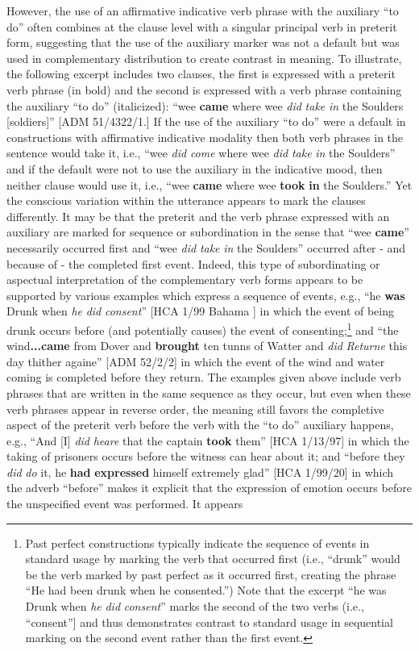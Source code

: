 However, the use of an affirmative indicative verb phrase with the auxiliary “to do” often combines at the clause level with a singular principal verb in preterit form, suggesting that the use of the auxiliary marker was not a default but was used in complementary distribution to create contrast in meaning. To illustrate, the following excerpt includes two clauses, the first is expressed with a preterit verb phrase (in bold) and the second is expressed with a verb phrase containing the auxiliary “to do” (italicized): “wee \textbf{came} where wee \textit{did} \textit{take} \textit{in} the Soulders [soldiers]” [ADM 51/4322/1.] If the use of the auxiliary “to do” were a default in constructions with affirmative indicative modality then both verb phrases in the sentence would take it, i.e., “wee \textit{did} \textit{come} where wee \textit{did} \textit{take} \textit{in} the Soulders” and if the default were not to use the auxiliary in the indicative mood, then neither clause would use it, i.e., “wee \textbf{came} where wee \textbf{took} \textbf{in} the Soulders.” Yet the conscious variation within the utterance appears to mark the clauses differently. It may be that the preterit and the verb phrase expressed with an auxiliary are marked for sequence or subordination in the sense that “wee \textbf{came}” necessarily occurred first and “wee \textit{did} \textit{take} \textit{in} the Soulders” occurred after - and because of - the completed first event. Indeed, this type of subordinating or aspectual interpretation of the complementary verb forms appears to be supported by various examples which express a sequence of events, e.g., “he \textbf{was} Drunk when \textit{he} \textit{did} \textit{consent}” [HCA 1/99 Bahama \citealt{Islands1722}] in which the event of being drunk occurs before (and potentially causes) the event of consenting;\footnote{Past perfect constructions typically indicate the sequence of events in standard usage by marking the verb that occurred first (i.e., “drunk” would be the verb marked by past perfect as it occurred first, creating the phrase “He had been drunk when he consented.”) Note that the excerpt “he was Drunk when \textit{he} \textit{did} \textit{consent}” marks the second of the two verbs (i.e., “consent”] and thus demonstrates contrast to standard usage in sequential marking on the second event rather than the first event.}  and “the wind\textbf{...came} from Dover and \textbf{brought} ten tunns of Watter and \textit{did} \textit{Returne} this day thither againe” [ADM 52/2/2] in which the event of the wind and water coming is completed before they return. The examples given above include verb phrases that are written in the same sequence as they occur, but even when these verb phrases appear in reverse order, the meaning still favors the completive aspect of the preterit verb before the verb with the “to do” auxiliary happens, e.g., “And [I] \textit{did} \textit{heare} that the captain \textbf{took} them” [HCA 1/13/97] in which the taking of prisoners occurs before the witness can hear about it; and “before they \textit{did} \textit{do} it, he \textbf{had} \textbf{expressed} himself extremely glad” [HCA 1/99/20] in which the adverb “before” makes it explicit that the expression of emotion occurs before the unspecified event was performed. It appears 